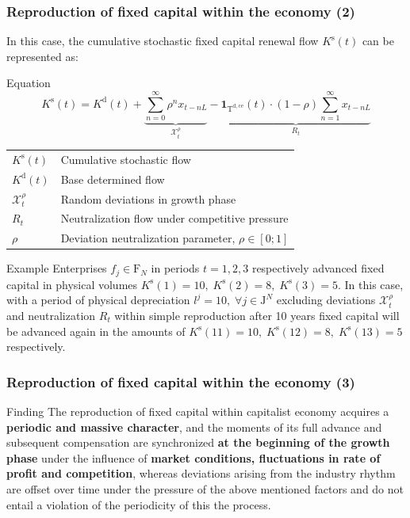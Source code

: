 \begin{frame}
  \frametitle{Reproduction of fixed capital within the economy (2)}
  In this case, the cumulative stochastic fixed capital renewal flow $K^{\mathrm{s}}(t)$ can be represented as:

  \begin{block}{Equation}
    \begin{equation}
      K^{\mathrm{s}}(t) = K^{\mathrm{d}}(t) + \underbrace{\sum_{n=0}^{\infty} \rho^{n} x_{t-nL}}_{\mathcal{X}_{t}^{\rho}} - \underbrace{\mathbf 1_{\mathrm{T}^{\mathrm{d,ce}}}(t) \cdot (1- \rho) \sum_{n=1}^{\infty} x_{t-nL}}_{R_{t}}
    \end{equation}

    \begin{tabularx}{\textwidth}{l>{\raggedright\arraybackslash\hyphenpenalty=10000\exhyphenpenalty=10000}X}
    $K^{\mathrm{s}}(t)$ & Cumulative stochastic flow \\
    $K^{\mathrm{d}}(t)$ & Base determined flow \\
    $\mathcal{X}_{t}^{\rho}$ & Random deviations in growth phase \\
    $R_{t}$ & Neutralization flow under competitive pressure \\
    $\rho$ & Deviation neutralization parameter, $\rho \in [0; 1]$
  \end{tabularx}
  \end{block}

  \begin{alertblock}{Example}
    Enterprises $f_j \in \mathrm{F}_{N}$ in periods $t=1,2,3$ respectively advanced fixed capital in physical volumes $K^{\mathrm{s}}(1) = 10, \; K^{\mathrm{s}}(2) = 8, \; K^{\mathrm{s}}(3) = 5$. In this case, with a period of physical depreciation $l^{j} = 10, \; \forall j \in \mathrm{J}^{N}$ excluding deviations $\mathcal{X}_{t}^{\rho}$ and neutralization $R_{t}$ within simple reproduction after 10 years fixed capital will be advanced again in the amounts of $K^{\mathrm{s}}(11) = 10, \; K^{\mathrm{s}}(12) = 8, \; K^{\mathrm{s}}(13) = 5$ respectively.
  \end{alertblock}
\end{frame}

\begin{frame}
  \frametitle{Reproduction of fixed capital within the economy (3)}
  \begin{alertblock}{Finding}
    The reproduction of fixed capital within capitalist economy acquires a \textbf{periodic and massive character}, and the moments of its full advance and subsequent compensation are synchronized \textbf{at the beginning of the growth phase} under the influence of \textbf{market conditions, fluctuations in rate of profit and competition}, whereas deviations arising from the industry rhythm are offset over time under the pressure of the above mentioned factors and do not entail a violation of the periodicity of this the process.
  \end{alertblock}
\end{frame}

